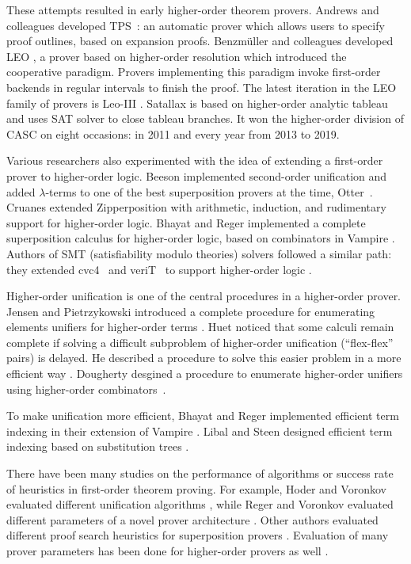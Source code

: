 These attempts resulted in early higher-order theorem provers. Andrews and
colleagues developed TPS~\cite{abinpx-96-tps}: an automatic prover which
allows users to specify proof outlines, based on expansion proofs. Benzm\"uller
and colleagues developed LEO \cite{cbmk-98-leo}, a prover based on higher-order
resolution which introduced the cooperative paradigm. Provers implementing this paradigm
invoke first-order backends in regular intervals to finish the proof. The latest
iteration in the LEO family of provers is Leo-III \cite{sb-21-leo3}. Satallax
\cite{cb-12-satallax} is based on higher-order analytic tableau and uses SAT solver
to close tableau branches. It won the higher-order division of CASC on eight occasions:
in 2011 and every year from 2013 to 2019.

Various researchers also experimented with the idea of extending a first-order
prover to higher-order logic. Beeson \cite{mb-04-lam-logic} implemented second-order
unification and added $\lambda$-terms to one of the best superposition
provers at the time, Otter~\cite{mcc-03-otter}. Cruanes extended Zipperposition
\cite{sc-15-simon-phd} with arithmetic, induction, and rudimentary support for
higher-order logic. Bhayat and Reger implemented a complete superposition
calculus  for higher-order logic, based on combinators  in Vampire
\cite{br-20-full-sup-w-combs}. Authors of SMT (satisfiability modulo theories) solvers followed a similar path:
they extended cvc4~\cite{cbetal-11-cvc4} and veriT~\cite{bodf-09-veriT} to
support higher-order logic \cite{brotb-19-ho-smt}.

Higher-order unification is one of the central procedures in a higher-order
prover. Jensen and Pietrzykowski introduced a complete procedure for enumerating
elements unifiers for higher-order terms \cite{jp-76-unif}. Huet noticed that
some calculi remain complete if solving a difficult subproblem of higher-order
unification (``flex-flex'' pairs) is delayed. He described a procedure to solve
this easier problem in a more efficient way \cite{gh-75-unification}. Dougherty
desgined a procedure to enumerate higher-order unifiers using higher-order
combinators~\cite{dd-93-comb-unif}. 

To make unification more efficient, Bhayat
and Reger implemented efficient term indexing in their extension of Vampire
\cite{br-20-full-sup-w-combs}. Libal and Steen designed efficient term indexing
based on substitution trees \cite{ls-16-indexing}.

There have been many studies on the performance of algorithms or success rate of
heuristics in first-order theorem proving. For example, Hoder and Voronkov
evaluated different unification algorithms \cite{hv-09-unifalgs}, while Reger and
Voronkov evaluated different parameters of a novel prover architecture
\cite{rsv-15-playing-with-avatar}. Other authors evaluated different proof
search heuristics for superposition provers \cite{gs-20-clausesel,
hrsv-16-selsel, sm-16-clausesel}. Evaluation of many prover parameters has been
done for higher-order provers as well
\cite{benzmueller-et-al-05-can-ho-fo-coop,fb-2016-internal-guidance-satallax,sb-15-beta,wskb-16-effective-norm}.
